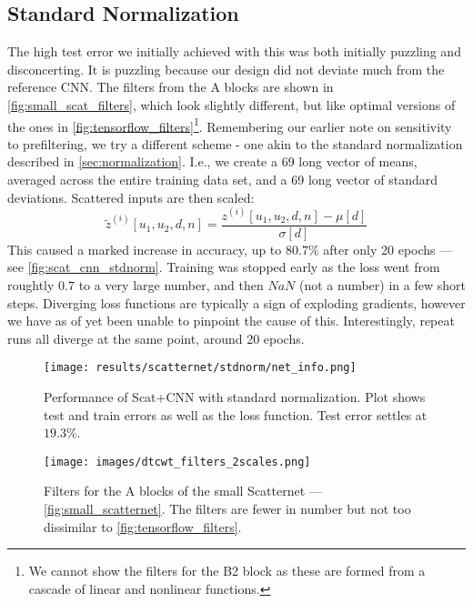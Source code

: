 \subsection{Standard Normalization}
  The high test error we initially achieved with this was both initially puzzling and
  disconcerting. It is puzzling because our design did not deviate much from
  the reference CNN\@. The filters from the A blocks are shown in
  \autoref{fig:small_scat_filters}, which look slightly different, but like
  optimal versions of the ones in \autoref{fig:tensorflow_filters}\footnote{We
  cannot show the filters for the B2 block as these are formed from a cascade
  of linear and nonlinear functions.}. Remembering our earlier note on
  sensitivity to prefiltering, we try a different scheme - one akin to the
  standard normalization described in \autoref{sec:normalization}. I.e., we
  create a 69 long vector of means, averaged across the entire
  training data set, and a 69 long vector of standard deviations. Scattered
  inputs are then scaled:
  \begin{equation}
    \tilde{z}^{(i)}[u_1,u_2,d,n] = \frac{z^{(i)} [u_1,u_2,d,n] - \mu[d]}{\sigma
    [d]}
  \end{equation}
  This caused a marked increase in accuracy, up to $80.7\%$ after only 20
  epochs --- see \autoref{fig:scat_cnn_stdnorm}. Training was stopped early as
  the loss went from roughtly $0.7$ to a very large number, and then $NaN$ (not
  a number) in a few short steps. Diverging loss functions are typically a sign of exploding
  gradients, however we have as of yet been unable to pinpoint the cause of
  this. Interestingly, repeat runs all diverge at the same point, around 20
  epochs.

  \begin{figure}
    \centering
      \texttt{[image: results/scatternet/stdnorm/net\_info.png]}
      \caption[Performance of Scat+CNN with energy normalization]
              {Performance of Scat+CNN with standard normalization. Plot shows
              test and train errors as well as the loss function. Test error
              settles at $19.3\%$.}
      \label{fig:scat_cnn_stdnorm}
  \end{figure}
  \begin{figure}
    \centering
    \texttt{[image: images/dtcwt\_filters\_2scales.png]}
    \caption[Filters for the A blocks of the small Scatternet]
            {Filters for the A blocks of the small Scatternet --- \autoref{fig:small_scatternet}.
            The filters are fewer in number but not too dissimilar to
            \autoref{fig:tensorflow_filters}.}
    \label{fig:small_scat_filters}
  \end{figure}

